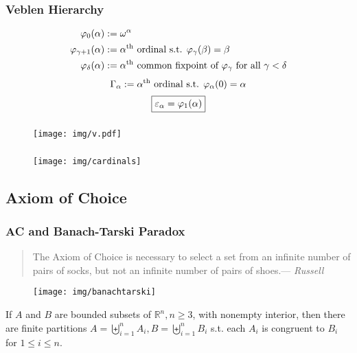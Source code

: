 \documentclass[UTF8,aspectratio=43,11pt,colorlinks,compress,openany]{beamer}%
\begin{document}
\begin{frame}\frametitle{Veblen Hierarchy}
\begin{align*}
\varphi_0(\alpha)&:=\omega^\alpha\\
\varphi_{\gamma+1}(\alpha)&:=\alpha\textsuperscript{th} \mbox{ ordinal s.t. } \varphi_\gamma(\beta)=\beta\\
\varphi_\delta(\alpha)&:=\alpha\textsuperscript{th} \mbox{ common fixpoint of $\varphi_\gamma$ for all } \gamma<\delta
\end{align*}
\[\Gamma_\alpha:=\alpha\textsuperscript{th} \mbox{ ordinal s.t. } \varphi_\alpha(0)=\alpha\]
\[\fbox{$\varepsilon_\alpha=\varphi_1(\alpha)$}\]
\end{frame}

\begin{frame}\frametitle{}
			\begin{figure}
			\texttt{[image: img/v.pdf]}
			\end{figure}
\end{frame}

\begin{frame}\frametitle{}
	\begin{figure}
		\texttt{[image: img/cardinals]}
	\end{figure}
\end{frame}

\subsection{Axiom of Choice}

\begin{frame}\frametitle{AC and Banach-Tarski Paradox}
	\begin{quote}
		The Axiom of Choice is necessary to select a set from an infinite number of pairs of socks, but not an infinite number of pairs of shoes.\hfill --- \textsl{Russell}
	\end{quote}
	\begin{figure}
		\texttt{[image: img/banachtarski]}
	\end{figure}
	\begin{theorem}
		If $A$ and $B$ are bounded subsets of $\mathbb{R}^n, n\geq 3$, with nonempty interior, then there are finite partitions $A=\biguplus\limits_{i=1}^n A_i, B=\biguplus\limits_{i=1}^n B_i$ s.t. each $A_i$ is congruent to $B_i$ for $1\leq i\leq n$.
	\end{theorem}
\end{frame}
\end{document}
